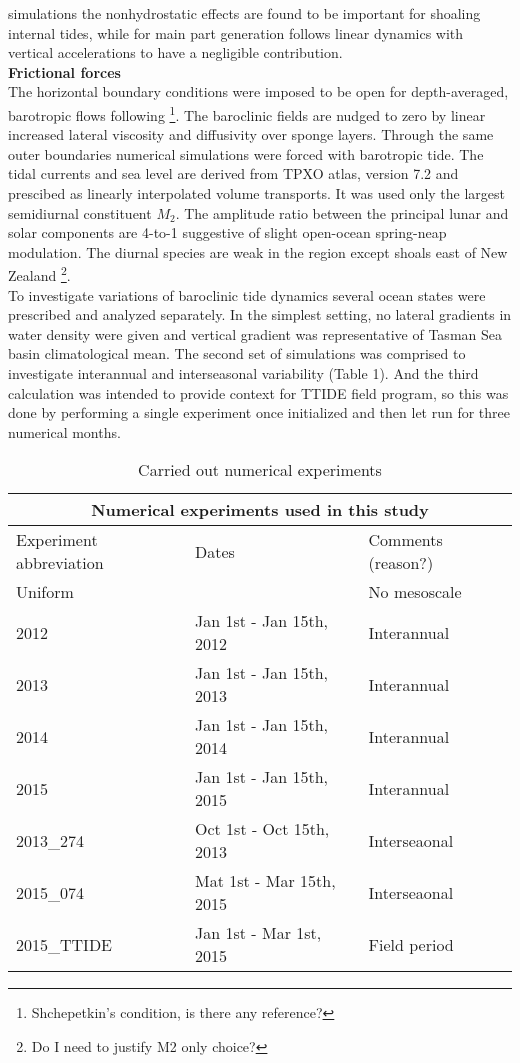 \documentclass[12pt]{article}
\begin{document}
simulations \citep{kang2012energetics, zhang2011three} the nonhydrostatic effects are found to be 
important for shoaling internal tides, while for main part generation follows linear dynamics with 
vertical accelerations to have a negligible contribution.\\
\textbf{Frictional forces}\\
The horizontal boundary conditions were imposed to be open for depth-averaged, barotropic flows 
following \footnote{Shchepetkin's condition, is there any reference?}. The baroclinic fields are 
nudged to zero by linear increased lateral viscosity and diffusivity over sponge layers. Through 
the same outer boundaries numerical simulations were forced with barotropic tide. The tidal 
currents and sea level are derived from TPXO atlas, version 7.2 \citep{egbert2002efficient} and 
prescibed as linearly interpolated volume transports. It was used only the largest semidiurnal 
constituent $M_2$. The amplitude ratio between the principal lunar and solar components are 4-to-1 
suggestive of slight open-ocean spring-neap modulation. The diurnal species are weak in the region 
except shoals east of New Zealand \citep{walters2001ocean}\footnote{Do I need to justify M2 only 
choice?}.\\
To investigate variations of baroclinic tide dynamics several ocean states were prescribed and 
analyzed separately. In the simplest setting, no lateral gradients in water density were given and 
vertical gradient was representative of Tasman Sea basin climatological mean. The second set of 
simulations was comprised to investigate interannual and interseasonal variability 
(Table 1). And the third calculation was intended to provide context for TTIDE field program, so 
this was done by performing a single experiment once initialized and then let run for three 
numerical months.
\begin{table}
	\caption{Carried out numerical experiments}
	\begin{tabular}{ |p{3cm}||p{5cm}|p{5cm}|  }
		\hline
		\multicolumn{3}{|c|}{Numerical experiments used in this study} \\
		\hline
		Experiment abbreviation & Dates & Comments (reason?) \\
		\hline
		Uniform & ~ & No mesoscale \\
		2012 &   Jan 1st - Jan 15th, 2012 & Interannual \\
		2013 &   Jan 1st - Jan 15th, 2013 & Interannual \\
		2014 &   Jan 1st - Jan 15th, 2014 & Interannual \\
		2015 &   Jan 1st - Jan 15th, 2015 & Interannual \\
		2013\_274 &   Oct 1st - Oct 15th, 2013 & Interseaonal \\
		2015\_074 &   Mat 1st - Mar 15th, 2015 & Interseaonal \\
		2015\_TTIDE &   Jan 1st - Mar 1st, 2015 & Field period \\
		\hline
	\end{tabular}
	\label{ch2:table_exp}
\end{table}
\end{document}
